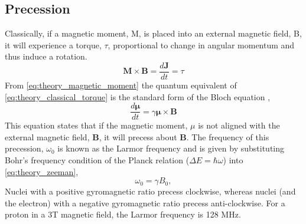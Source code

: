 \subsection{Precession}

Classically, if a magnetic moment, M, is placed into an external magnetic field, B, it will experience a torque, $\tau$, proportional to change in angular momentum and thus induce a rotation.
\begin{equation}
\mathbf{M \times B} = \frac{d\mathbf{J}}{dt} = \tau
\label{eq:theory_classical_torque}
\end{equation}
From \eqref{eq:theory_magnetic_moment} the quantum equivalent of \eqref{eq:theory_classical_torque} is the standard form of the Bloch equation \cite{bloch_nuclear_1946},
\begin{equation}
\frac{d\mathbf{\mu}}{dt} = \gamma \mathbf{\mu \times B}
\label{eq:theory_bloch_standard}
\end{equation}
This equation states that if the magnetic moment, $\mu$ is not aligned with the external magnetic field, $\mathbf{B}$, it will precess about $\mathbf{B}$. The frequency of this precession, $\omega_0$ is known as the Larmor frequency and is given by substituting Bohr's frequency condition of the Planck relation ($\Delta E = \hbar \omega $) into \eqref{eq:theory_zeeman},
\begin{equation}
\omega_0=\gamma B_0,
\label{eq:theory_larmor}
\end{equation}
Nuclei with a positive gyromagnetic ratio precess clockwise, whereas nuclei (and the electron) with a negative gyromagnetic ratio precess anti-clockwise. For a proton in a 3T magnetic field, the Larmor frequency is 128 MHz.

